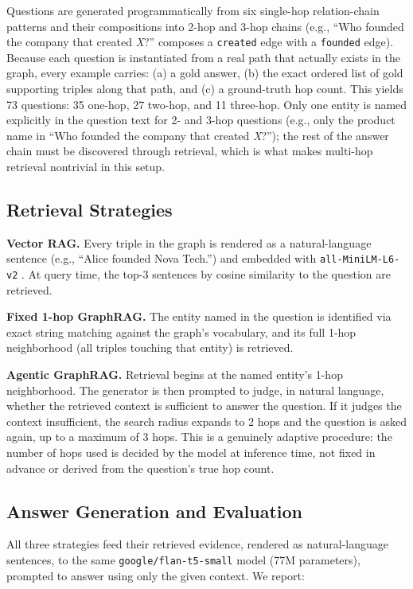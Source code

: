 \documentclass[11pt]{article}
\begin{document}
Questions are generated programmatically from six single-hop relation-chain patterns and their compositions into 2-hop and 3-hop chains (e.g., ``Who founded the company that created \emph{X}?'' composes a \texttt{created} edge with a \texttt{founded} edge). Because each question is instantiated from a real path that actually exists in the graph, every example carries: (a) a gold answer, (b) the exact ordered list of gold supporting triples along that path, and (c) a ground-truth hop count. This yields 73 questions: 35 one-hop, 27 two-hop, and 11 three-hop. Only one entity is named explicitly in the question text for 2- and 3-hop questions (e.g., only the product name in ``Who founded the company that created \emph{X}?''); the rest of the answer chain must be discovered through retrieval, which is what makes multi-hop retrieval nontrivial in this setup.

\subsection{Retrieval Strategies}

\textbf{Vector RAG.} Every triple in the graph is rendered as a natural-language sentence (e.g., ``Alice founded Nova Tech.'') and embedded with \texttt{all-MiniLM-L6-v2} \citep{reimers2019sbert}. At query time, the top-3 sentences by cosine similarity to the question are retrieved.

\textbf{Fixed 1-hop GraphRAG.} The entity named in the question is identified via exact string matching against the graph's vocabulary, and its full 1-hop neighborhood (all triples touching that entity) is retrieved.

\label{sec:agentic}
\textbf{Agentic GraphRAG.} Retrieval begins at the named entity's 1-hop neighborhood. The generator is then prompted to judge, in natural language, whether the retrieved context is sufficient to answer the question. If it judges the context insufficient, the search radius expands to 2 hops and the question is asked again, up to a maximum of 3 hops. This is a genuinely adaptive procedure: the number of hops used is decided by the model at inference time, not fixed in advance or derived from the question's true hop count.

\subsection{Answer Generation and Evaluation}

All three strategies feed their retrieved evidence, rendered as natural-language sentences, to the same \texttt{google/flan-t5-small} model (77M parameters), prompted to answer using only the given context. We report:
\end{document}
